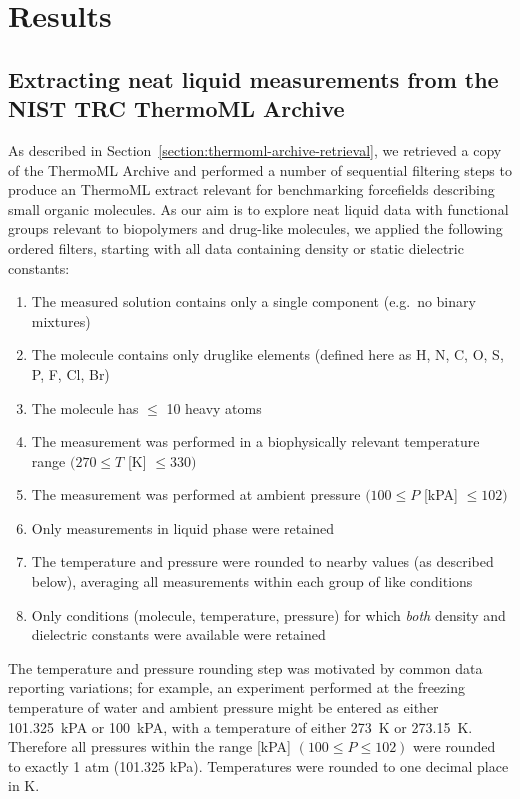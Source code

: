 \documentclass[aps,pre,twocolumn,nofootinbib,superscriptaddress,linenumbers]{revtex4-1}
\begin{document}

\section{Results}

\subsection{Extracting neat liquid measurements from the NIST TRC ThermoML Archive}
\label{section:filtering-thermoml}

As described in Section~\ref{section:thermoml-archive-retrieval}, we retrieved a copy of the ThermoML Archive and performed a number of sequential filtering steps to produce an ThermoML extract relevant for benchmarking forcefields describing small organic molecules.  
As our aim is to explore neat liquid data with functional groups relevant to biopolymers and drug-like molecules, we applied the following ordered filters, starting with all data containing density or static dielectric constants: 
\begin{enumerate}
 \item The measured solution contains only a single component (e.g.~no binary mixtures)
 \item The molecule contains only druglike elements (defined here as H, N, C, O, S, P, F, Cl, Br)
 \item The molecule has $\le$ 10 heavy atoms
 \item The measurement was performed in a biophysically relevant temperature range $(270 \le T$ [K] $\le 330)$
 \item The measurement was performed at ambient pressure $(100 \le P$ [kPA]  $\le 102)$
 \item Only measurements in liquid phase were retained
 \item The temperature and pressure were rounded to nearby values (as described below), averaging all measurements within each group of like conditions
 \item Only conditions (molecule, temperature, pressure) for which \emph{both} density and dielectric constants were available were retained
\end{enumerate}
The temperature and pressure rounding step was motivated by common data reporting variations; for example, an experiment performed at the freezing temperature of water and ambient pressure might be entered as either 101.325~kPA or 100~kPA, with a temperature of either 273~K or 273.15~K.  
Therefore all pressures within the range [kPA] $(100 \le P \le 102)$ were rounded to exactly 1 atm (101.325 kPa).  
Temperatures were rounded to one decimal place in K. 
\end{document}
